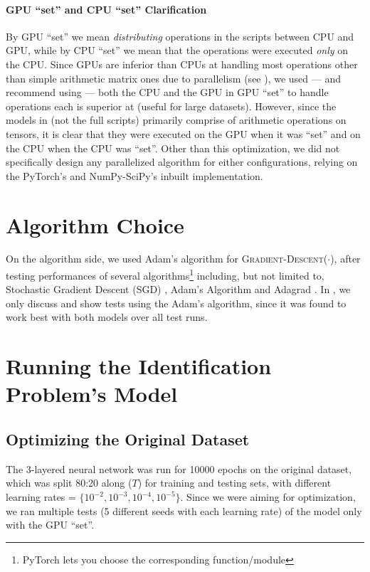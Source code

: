 \paragraph{GPU ``set'' and CPU ``set'' Clarification}
By GPU ``set'' we mean \textit{distributing} operations in the scripts between CPU and GPU, while by CPU ``set'' we mean that the operations were executed \textit{only} on the CPU. Since GPUs are inferior than CPUs at handling most operations other than simple arithmetic matrix ones due to parallelism (see ), we used --- and recommend using --- both the CPU and the GPU in GPU ``set'' to handle operations each is superior at (useful for large datasets). However, since the models in  (not the full scripts) primarily comprise of arithmetic operations on  tensors, it is clear that they were executed on the GPU when it was ``set'' and on the CPU when the CPU was ``set''. Other than this optimization, we did not specifically design any parallelized algorithm for either configurations, relying on the PyTorch's and NumPy-SciPy's inbuilt implementation.

\section{Algorithm Choice} \label{sec:Algorithm Choice}
On the algorithm side, we used Adam's algorithm for \textsc{Gradient-Descent}($\cdot$), after testing performances of several algorithms\footnote{PyTorch lets you choose the corresponding function/module} including, but not limited to, Stochastic Gradient Descent (SGD) \cite{SGD}, Adam's Algorithm \cite{Adam} and Adagrad \cite{Adagrad}. In , we only discuss and show tests using the Adam's algorithm, since it was found to work best with both models over all test runs.

\section{Running the Identification Problem's Model} \label{sec:Running the Identification Problem's Model}
\subsection{Optimizing the Original Dataset} \label{sec:Identification Problem-Optimizing the Original Dataset}
The 3-layered neural network was run for 10000 epochs on the original dataset, which was split 80:20 along ($T$) for training and testing sets, with different learning rates = $\{10^{-2}, 10^{-3}, 10^{-4}, 10^{-5}\}$. Since we were aiming for optimization, we ran multiple tests (5 different seeds with each learning rate) of the model only with the GPU ``set''.

